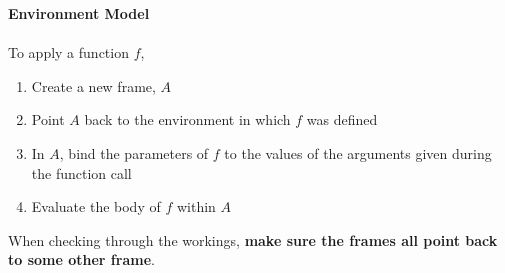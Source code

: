 \documentclass[a4paper]{article} \usepackage[backend=biber, style=numeric, sorting=none]{biblatex}
\begin{document}
\begin{multicols*}{4}
{\small\textbf{Environment Model}}
\\ \\
To apply a function $f$,
\begin{enumerate}
\itemsep -0.5em
\item Create a new frame, $A$
\item Point $A$ back to the environment in which $f$ was defined
\item In $A$, bind the parameters of $f$ to the values of the arguments given during the function call
\item Evaluate the body of $f$ within $A$
\end{enumerate}

When checking through the workings, \textbf{make sure the frames all point back to some other frame}. \\


\end{multicols*}
\end{document}
